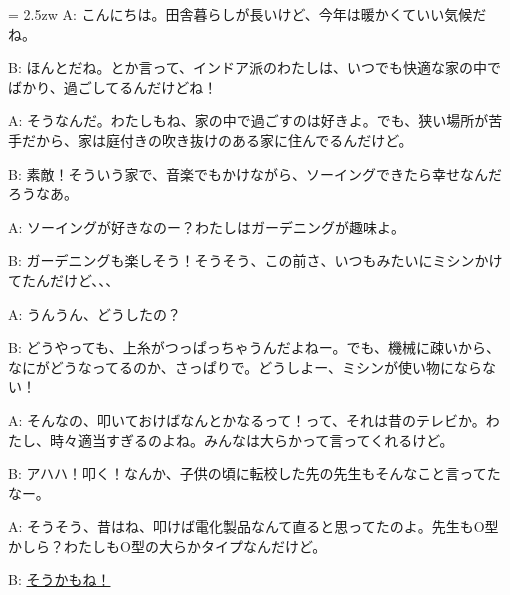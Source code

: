 \documentclass[11pt]{amsart}
\title{}
\author{}
\newenvironment{hangall}[1]{\hangindent = 2.5zw\everypar{\hangindent = 2.5zw}}{}
\begin{document}
\maketitle
\begin{hangall}{}%
A: こんにちは。田舎暮らしが長いけど、今年は暖かくていい気候だね。

B: ほんとだね。とか言って、インドア派のわたしは、いつでも快適な家の中でばかり、過ごしてるんだけどね！

A: そうなんだ。わたしもね、家の中で過ごすのは好きよ。でも、狭い場所が苦手だから、家は庭付きの吹き抜けのある家に住んでるんだけど。

B: 素敵！そういう家で、音楽でもかけながら、ソーイングできたら幸せなんだろうなあ。

A: ソーイングが好きなのー？わたしはガーデニングが趣味よ。

B: ガーデニングも楽しそう！そうそう、この前さ、いつもみたいにミシンかけてたんだけど、、、

A: うんうん、どうしたの？

B: どうやっても、上糸がつっぱっちゃうんだよねー。でも、機械に疎いから、なにがどうなってるのか、さっぱりで。どうしよー、ミシンが使い物にならない！

A: そんなの、叩いておけばなんとかなるって！って、それは昔のテレビか。わたし、時々適当すぎるのよね。みんなは大らかって言ってくれるけど。

B: アハハ！叩く！なんか、子供の頃に転校した先の先生もそんなこと言ってたなー。

A: そうそう、昔はね、叩けば電化製品なんて直ると思ってたのよ。先生もO型かしら？わたしもO型の大らかタイプなんだけど。

B: \ul{そうかもね！}\end{hangall}
\end{document}
